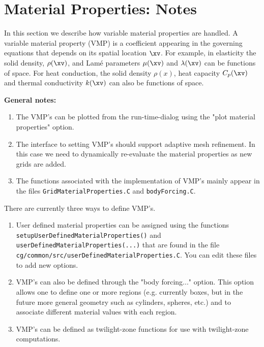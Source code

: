 \section{Material Properties: Notes}\label{sec:materialProperties}



In this section we describe how variable material properties are
handled. A variable material property (VMP) is a coefficient
appearing in the governing equations that depends on its
spatial location $\xv$. For example, in elasticity the 
solid density, $\rho(\xv)$, and Lam\'e parameters  $\mu(\xv)$ and $\lambda(\xv)$ can be functions of
space. For heat conduction, the solid density $\rho(x)$, heat capacity $C_p(\xv)$ and thermal conductivity
$k(\xv)$ can also be functions of space.


{\bf General notes:}
\begin{enumerate}
  \item The VMP's can be plotted from the run-time-dialog using the "plot material properties"
  option.
  \item The interface to setting VMP's should support adaptive mesh refinement. In this case
      we need to dynamically re-evaluate the material properties as new grids are added.
  \item The functions associated with the implementation of VMP's mainly appear in the files
   {\tt GridMaterialProperties.C} and {\tt bodyForcing.C}.
\end{enumerate}


There are currently three ways to define VMP's. 
\begin{enumerate}
  \item User defined material
properties can be assigned using the functions {\tt setupUserDefinedMaterialProperties()}
and {\tt userDefinedMaterialProperties(...)}
that are found in the file {\tt cg/common/src/userDefinedMaterialProperties.C}.
You can edit these files to add new options. 

  \item VMP's can also be defined through the "body forcing..." option. This
option allows one to define one or more regions (e.g. currently boxes, but in the future more
general geometry such as cylinders, spheres, etc.) 
and to associate different material values with each region.

  \item VMP's can be defined as twilight-zone functions for use with twilight-zone computations.
\end{enumerate}



